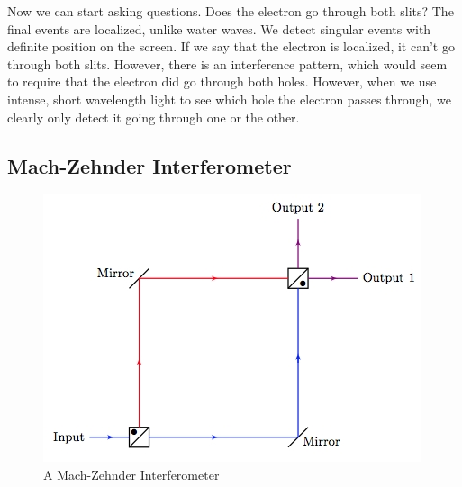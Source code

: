 \documentclass[a4paper,twoside,master.tex]{subfiles}
\begin{document}
Now we can start asking questions. Does the electron go through both slits? The final events are localized, unlike water waves. We detect singular events with definite position on the screen. If we say that the electron is localized, it can't go through both slits. However, there is an interference pattern, which would seem to require that the electron did go through both holes. However, when we use intense, short wavelength light to see which hole the electron passes through, we clearly only detect it going through one or the other.

\subsection{Mach-Zehnder Interferometer}
\begin{figure}[h]
    \centering
    \includegraphics{mach_zehnder_interferometer}
    \caption{A Mach-Zehnder Interferometer}
    \label{fig:mz_inter}
\end{figure}
\end{document}
